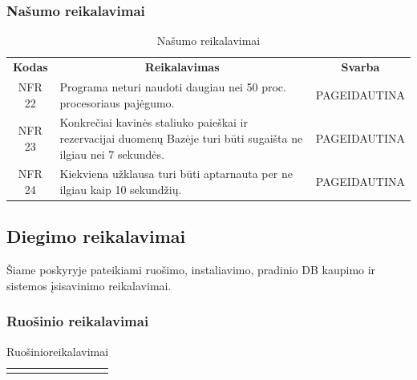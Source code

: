 \documentclass{VUMIFPSkursinis}
\begin{document}
{{{{{\begin{center}
\begin{table}[H]
\begin{tabular}{|p{2cm}|p{}|p{}|}
	
	\end{tabular}
	
	\label{table:Laikasreikalingasatstatytiprogramosveikimą}
	\end{table}

\end{center}


\subsubsection{Našumo reikalavimai}
\begin{center}
	\begin{table}[H]
	\caption{Našumo reikalavimai}
	\begin{tabular}{|p{2cm}|p{}|p{}|}
	\hline
	    \rowcolor{lightgray}
		\multicolumn{3}{|c|}{Našumo reikalavimai}\\
		
	\hline
		\multicolumn{1}{|c|}{{\bfseries Kodas}}&
		\multicolumn{1}{|c|}{{\bfseries Reikalavimas}}&
		\multicolumn{1}{|c|}{{\bfseries Svarba}}\\
	\hline 	
		\multicolumn{1}{|c|}{NFR 22}&
		{Programa neturi naudoti daugiau nei 50 proc. procesoriaus pajėgumo.}&
		\multicolumn{1}{|p{1.5cm}|}{PAGEIDAUTINA}\\	
	\hline 	
		\multicolumn{1}{|c|}{NFR 23}&
		{Konkrečiai kavinės staliuko paieškai ir rezervacijai duomenų Bazėje turi būti sugaišta ne ilgiau nei 7 sekundės.}&
		\multicolumn{1}{|p{1.5cm}|}{PAGEIDAUTINA}\\	
	\hline 	
		\multicolumn{1}{|c|}{NFR 24}&
		{Kiekviena užklausa turi būti aptarnauta per ne ilgiau kaip 10 sekundžių.}&
		\multicolumn{1}{|p{1.5cm}|}{PAGEIDAUTINA}\\		
	\hline
	
	
	\end{tabular}
	
	\label{table:Našumoreikalavimai}
	\end{table}

\end{center}

\pagebreak

\subsection{Diegimo reikalavimai}
Šiame poskyryje pateikiami ruošimo, instaliavimo, pradinio DB kaupimo ir sistemos įsisavinimo reikalavimai.
\subsubsection{Ruošinio reikalavimai}
\begin{center}
	\begin{table}[H]
	\caption{Ruošinioreikalavimai}
	\begin{tabular}{|p{2cm}|p{}|p{}|}
	\hline
	    \rowcolor{lightgray}
		\multicolumn{3}{|c|}{Ruošinio reikalavimai}\\
		

\end{tabular}
\end{table}
\end{center}}}}}}
\end{document}
